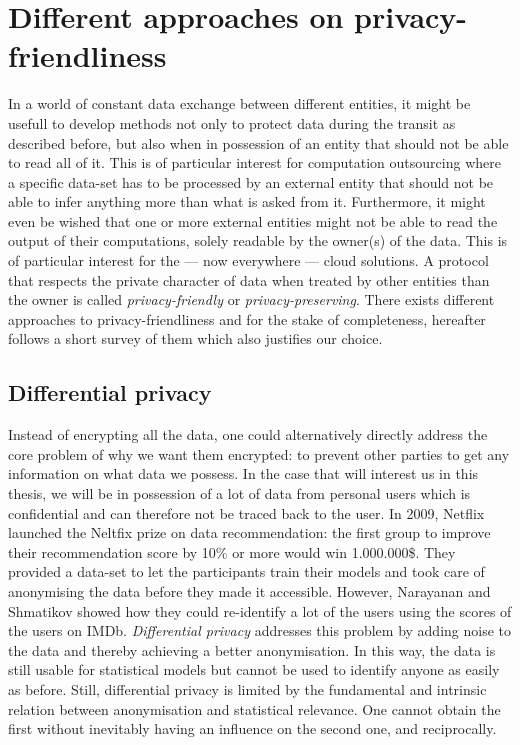 \section{Different approaches on privacy-friendliness}
In a world of constant data exchange between different entities, it might be usefull to develop methods not only to protect data during the transit as described before, but also when in possession of an entity that should not be able to read all of it. This is of particular interest for computation outsourcing where a specific data-set has to be processed by an external entity that should not be able to infer anything more than what is asked from it. Furthermore, it might even be wished that one or more external entities might not be able to read the output of their computations, solely readable by the owner(s) of the data. This is of particular interest for the --- now everywhere --- cloud solutions. A protocol that respects the private character of data when treated by other entities than the owner is called \emph{privacy-friendly} or \emph{privacy-preserving}. There exists different approaches to privacy-friendliness and for the stake of completeness, hereafter follows a short survey of them which also justifies our choice.

\subsection{Differential privacy}
Instead of encrypting all the data, one could alternatively directly address the core problem of why we want them encrypted: to prevent other parties to get any information on what data we possess. In the case that will interest us in this thesis, we will be in possession of a lot of data from personal users which is confidential and can therefore not be traced back to the user. In 2009, Netflix launched the Neltfix prize on data recommendation: the first group to improve their recommendation score by 10\% or more would win 1.000.000\$. They provided a data-set to let the participants train their models and took care of anonymising the data before they made it accessible. However, Narayanan and Shmatikov showed how they could re-identify a lot of the users using the scores of the users on IMDb. \emph{Differential privacy} \cite{Dwork2008DifferentialResults} addresses this problem by adding noise to the data and thereby achieving a better anonymisation. In this way, the data is still usable for statistical models but cannot be used to identify anyone as easily as before. Still, differential privacy is limited by the fundamental and intrinsic relation between anonymisation and statistical relevance. One cannot obtain the first without inevitably having an influence on the second one, and reciprocally.


